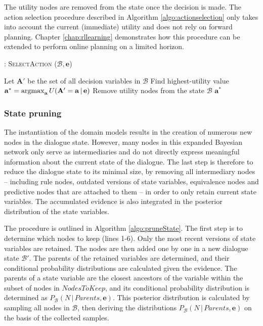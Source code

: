 The utility nodes are removed from the state once the decision is made. The action selection procedure described in Algorithm \ref{algo:actionselection} only takes into account the current (immediate) utility and does not rely on forward planning.  Chapter \ref{chap:rllearning} demonstrates how this procedure can be extended to perform online planning on a limited horizon. 


\begin{algorithm}[h]
\caption{: \textsc{SelectAction} ($\mathcal{B}, \mathbf{e}$)}
\begin{algorithmic}[1] \vspace{1mm}
\STATE Let $\mathbf{A}'$ be the set of all decision variables in $\mathcal{B}$
\STATE Find highest-utility value $\mathbf{a}^* = \argmax_{\mathbf{a}} U(\mathbf{A}' = \mathbf{a} \, | \, \mathbf{e})$
\STATE Remove utility nodes from the state $\mathcal{B}$
\RETURN $\mathbf{a}^*$
\end{algorithmic}
\label{algo:actionselection}
\end{algorithm}

\subsubsection*{State pruning}

The instantiation of the domain models results in the creation of numerous new nodes in the dialogue state. However, many nodes in this expanded Bayesian network  only serve as intermediaries and do not directly express meaningful information about the current state of the dialogue. The last step is therefore to reduce the dialogue state to its minimal size, by removing all intermediary nodes -- including rule nodes, outdated versions of state variables, equivalence nodes and predictive nodes that are attached to them -- in order to only retain current state variables. The accumulated evidence is also integrated in the posterior distribution of the state variables.

The procedure is outlined in Algorithm \ref{algo:pruneState}. The first step is to determine which nodes to keep (lines 1-6).  Only the most recent versions of state variables are retained. 
The nodes are then added one by one in a new dialogue state $\mathcal{B}'$.  The parents of the retained variables are determined, and their conditional probability distributions are calculated given the evidence.  The parents of a state variable are the closest ancestors of the variable within the subset of nodes in $\mathit{NodesToKeep}$, and its conditional probability distribution is determined as $P_{\mathcal{B}}(N \, | \, \mathit{Parents}, \mathbf{e})$.  This posterior distribution is calculated by sampling all nodes in $\mathcal{B}$, then deriving the distributions $P_{\mathcal{B}}(N \, | \, \mathit{Parents}, \mathbf{e})$ on the basis of the collected samples.  

